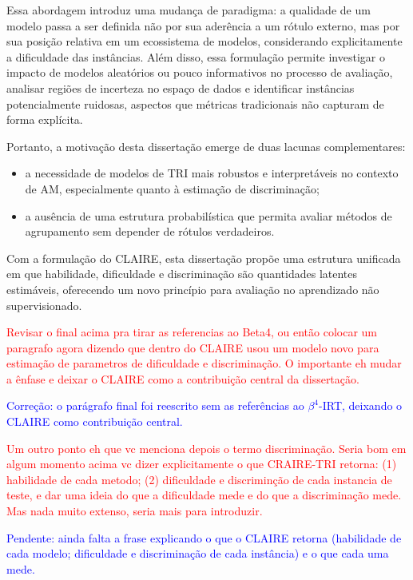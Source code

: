Essa abordagem introduz uma mudança de paradigma: a qualidade de um modelo passa a ser definida não por sua aderência a um rótulo externo, mas por sua posição relativa em um ecossistema de modelos, considerando explicitamente a dificuldade das instâncias. Além disso, essa formulação permite investigar o impacto de modelos aleatórios ou pouco informativos no processo de avaliação, analisar regiões de incerteza no espaço de dados e identificar instâncias potencialmente ruidosas, aspectos que métricas tradicionais não capturam de forma explícita.

Portanto, a motivação desta dissertação emerge de duas lacunas complementares:

\begin{itemize}
    \item[i] a necessidade de modelos de \gls{TRI} mais robustos e interpretáveis no contexto de \gls{AM}, especialmente quanto à estimação de discriminação;
    \item [ii] a ausência de uma estrutura probabilística que permita avaliar métodos de agrupamento sem depender de rótulos verdadeiros. 

\end{itemize}

Com a formulação do \gls{CLAIRE}, esta dissertação propõe uma estrutura unificada em que habilidade, dificuldade e discriminação são quantidades latentes estimáveis, oferecendo um novo princípio para avaliação no aprendizado não supervisionado.

\textcolor{red}{Revisar o final acima pra tirar as referencias ao Beta4, ou então colocar um paragrafo agora dizendo que dentro do CLAIRE usou um modelo novo para estimação de parametros de dificuldade e discriminação. O importante eh mudar a ênfase e deixar o CLAIRE como a contribuição central da dissertação.}

\textcolor{blue}{Correção: o parágrafo final foi reescrito sem as referências ao $\beta^4$-\gls{IRT}, deixando o \gls{CLAIRE} como contribuição central.}

\textcolor{red}{Um outro ponto eh que vc menciona depois o termo discriminação. Seria bom em algum momento acima vc dizer explicitamente o que CRAIRE-TRI retorna: (1) habilidade de cada metodo; (2) dificuldade e discriminção de cada instancia de teste, e dar uma ideia do que a dificuldade mede e do que a discriminação mede. Mas nada muito extenso, seria mais para introduzir.}

\textcolor{blue}{Pendente: ainda falta a frase explicando o que o \gls{CLAIRE} retorna (habilidade de cada modelo; dificuldade e discriminação de cada instância) e o que cada uma mede.}

